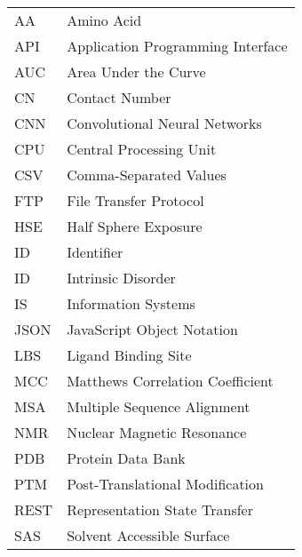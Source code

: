 \documentclass[12pt,a4paper]{report}
\begin{document}


\tableofcontents







\begin{tabular}{ll}
AA & Amino Acid \\
API & Application Programming Interface \\
AUC & Area Under the Curve \\
CN & Contact Number \\
CNN & Convolutional Neural Networks \\
CPU & Central Processing Unit \\
CSV & Comma-Separated Values \\
FTP & File Transfer Protocol \\
HSE & Half Sphere Exposure \\
ID & Identifier  \\
ID & Intrinsic Disorder \\
IS & Information Systems \\
JSON & JavaScript Object Notation \\
LBS & Ligand Binding Site \\
MCC & Matthews Correlation Coefficient \\
MSA & Multiple Sequence Alignment \\
NMR & Nuclear Magnetic Resonance \\
PDB & Protein Data Bank \\
PTM & Post-Translational Modification \\
REST & Representation State Transfer \\
SAS & Solvent Accessible Surface \\

\end{tabular}




\listoffigures

\listoftables
\end{document}
